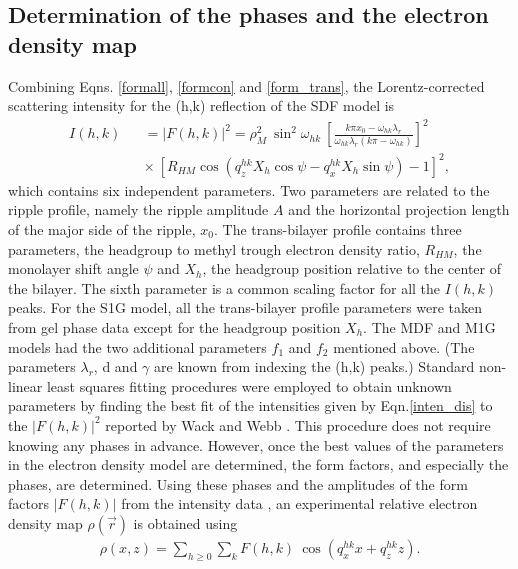 \subsection{Determination of the phases and the electron density map}

Combining Eqns. \ref{formall}, \ref{formcon} and \ref{form_trans}, the 
Lorentz-corrected scattering intensity for the (h,k) reflection of the 
SDF model is
\begin{eqnarray}
\label{inten_dis}
I(h,k) && = |F(h,k)|^2 
= \rho_M^2\ \sin^2 \omega_{hk}\ \left[\frac{k \pi x_0 -
\omega_{hk} \lambda_r}{\omega_{hk} \lambda_r (k \pi 
- \omega_{hk})} \right]^2 \nonumber\\
&& \times\ [R_{HM} \cos (q_z^{hk} X_h \cos \psi - q_x^{hk} X_h \sin \psi) -1]^2,
\end{eqnarray}
which contains six independent parameters.
Two parameters are related to the ripple profile, namely
the ripple amplitude $A$ and the horizontal projection length of the major side
of the ripple, $x_0$. The trans-bilayer profile contains three
parameters, the headgroup to methyl trough electron
density ratio, $R_{HM}$, the monolayer shift angle $\psi$ and 
$X_h$, the headgroup position relative to the center of the bilayer. 
The sixth parameter is a common scaling factor for all the
$I(h,k)$ peaks.  For the S1G model, all the trans-bilayer profile parameters
were taken from gel phase data \cite{WSN89} except for the headgroup position
$X_h$.   The MDF and M1G models had 
the two additional parameters
$f_1$ and $f_2$ mentioned above.
(The parameters ${\lambda}_r$, d and $\gamma$ are known
from indexing the (h,k) peaks.)
Standard non-linear least squares fitting procedures were employed to
obtain unknown parameters by finding the best
fit of the intensities given by Eqn.\ref{inten_dis} to the $|F(h,k)|^2$ reported
by Wack and Webb \cite{Wac89a}. 
This procedure does not require knowing any phases in advance.  However,
once the best values of the parameters in the electron density model are
determined, the form factors, and especially the phases, are determined.
Using these phases and the amplitudes of the form factors $|F(h,k)|$ from 
the intensity data \cite{Wac89a},
an experimental relative electron density map $\rho(\vec{r})$ 
is obtained using
\begin{eqnarray}
\label{discretell}
\rho(x,z) = \sum_{h \geq 0} \sum_{k} F(h,k) \ \cos(q^{hk}_x x + q^{hk}_z z).
\end{eqnarray}

